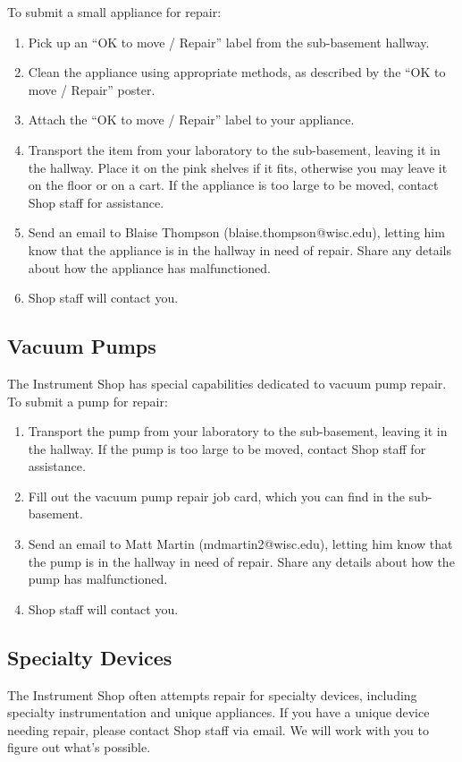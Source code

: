 \documentclass{training}
\begin{document}
To submit a small appliance for repair:

\begin{enumerate}
  \item Pick up an ``OK to move / Repair'' label from the sub-basement hallway.
  \item Clean the appliance using appropriate methods, as described by the ``OK to move / Repair'' poster.
  \item Attach the ``OK to move / Repair'' label to your appliance.
  \item Transport the item from your laboratory to the sub-basement, leaving it in the hallway. Place it on the pink shelves if it fits, otherwise you may leave it on the floor or on a cart. If the appliance is too large to be moved, contact Shop staff for assistance.
  \item Send an email to Blaise Thompson (blaise.thompson@wisc.edu), letting him know that the appliance is in the hallway in need of repair. Share any details about how the appliance has malfunctioned.
  \item Shop staff will contact you.
\end{enumerate}

\subsection{Vacuum Pumps}

The Instrument Shop has special capabilities dedicated to vacuum pump repair.
To submit a pump for repair:

\begin{enumerate}
  \item Transport the pump from your laboratory to the sub-basement, leaving it in the hallway. If the pump is too large to be moved, contact Shop staff for assistance.
  \item Fill out the vacuum pump repair job card, which you can find in the sub-basement.
  \item Send an email to Matt Martin (mdmartin2@wisc.edu), letting him know that the pump is in the hallway in need of repair. Share any details about how the pump has malfunctioned.
  \item Shop staff will contact you.
\end{enumerate}

\subsection{Specialty Devices}

The Instrument Shop often attempts repair for specialty devices, including specialty instrumentation and unique appliances.
If you have a unique device needing repair, please contact Shop staff via email.
We will work with you to figure out what's possible.
\end{document}
